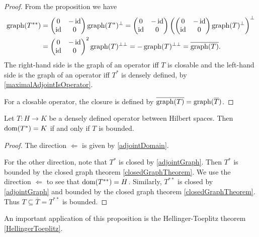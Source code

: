 \begin{proof}
From the proposition we have
\begin{align*}
\operatorname{graph}(T^{**}) &=  \begin{pmatrix}
0 & -\operatorname{id} \\ \operatorname{id} & 0
\end{pmatrix}\operatorname{graph}(T^*)^\perp 
=  \begin{pmatrix}
0 & -\operatorname{id} \\ \operatorname{id} & 0
\end{pmatrix}\left(\begin{pmatrix}
0 & -\operatorname{id} \\ \operatorname{id} & 0
\end{pmatrix}\operatorname{graph}(T)^\perp\right)^\perp \\
&= \begin{pmatrix}
0 & -\operatorname{id} \\ \operatorname{id} & 0
\end{pmatrix}^2\operatorname{graph}(T)^{\perp\perp} = -\operatorname{graph}(T)^{\perp\perp}
= \overline{\operatorname{graph}(T)}.
\end{align*}
The right-hand side is the graph of an operator iff $T$ is closable and the left-hand side is the graph of an operator iff $T^*$ is densely defined, by \ref{maximalAdjointIsOperator}.

For a closable operator, the closure is defined by $\overline{\operatorname{graph}(T)} = \operatorname{graph}(\overline{T})$.
\end{proof}

\begin{proposition} \label{adjointBoundedEverywhereDefined}
Let $T: H\to K$ be a densely defined operator between Hilbert spaces. Then $\operatorname{dom}(T^*) = K$ \textup{if and only if} $T$ is bounded.
\end{proposition}
\begin{proof}
The direction $\Leftarrow$ is given by \ref{adjointDomain}.

For the other direction, note that $T^*$ is closed by \ref{adjointGraph}. Then $T^*$ is bounded by the closed graph theorem \ref{closedGraphTheorem}. We use the direction $\Leftarrow$ to see that $\operatorname{dom}(T^{**}) = H$. Similarly, $T^{**}$ is closed by \ref{adjointGraph} and bounded by the closed graph theorem \ref{closedGraphTheorem}. Thus $T\subseteq \overline{T} = T^{**}$ is bounded.
\end{proof}

An important application of this proposition is the Hellinger-Toeplitz theorem \ref{HellingerToeplitz}.


